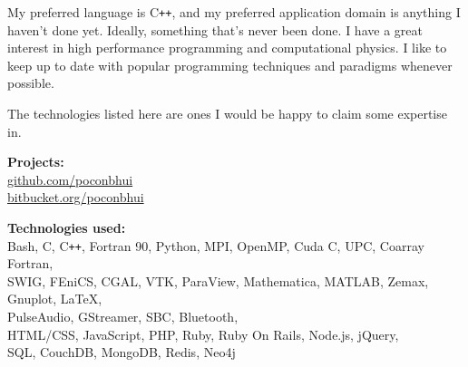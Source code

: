 \documentclass[11pt]{article}
\newcommand{\resumeSection}[1]{
    \par
    \vspace{\baselineskip}
    \large {\sc {#1}}
    \par
    \vspace{-0.9\baselineskip}
    \hrulefill
    \vspace{0.5\baselineskip}
    \par
}
\newenvironment{resumeSubSectionBody}{
    \par
    \vspace{-0.8\parskip}
    \begin{small}
    \par
} {
    \par
    \end{small}
    \par
}
\begin{document}
%
%
\begin{resumeSubSectionBody}

    My preferred language is C\verb!++!,
    and my preferred application domain is anything I haven't done yet.
    Ideally, something that's never been done.
    I have a great interest in high performance programming
    and computational physics.
    I like to keep up to date with popular programming techniques and paradigms
    whenever possible.

    The technologies listed here are ones I would be happy to claim some
    expertise in.

    \begin{description}
        \item{\bf Projects:} \\
            \href{https://github.com/poconbhui}{github.com/poconbhui} \\
            \href{https://bitbucket.org/poconbhui}{bitbucket.org/poconbhui}

        \item{\bf Technologies used:} \\
            Bash, C, C\verb!++!, Fortran 90, Python,
            MPI, OpenMP, Cuda C, UPC, Coarray Fortran,
            \\
            SWIG, FEniCS, CGAL, VTK, ParaView,
            Mathematica, MATLAB, Zemax, Gnuplot, LaTeX,
            \\
            PulseAudio, GStreamer, SBC, Bluetooth,
            \\
            HTML/CSS, JavaScript, PHP, Ruby,
            Ruby On Rails, Node.js, jQuery,
            \\
            SQL, CouchDB, MongoDB, Redis, Neo4j
    \end{description}

\end{resumeSubSectionBody}




\resumeSection{Education \& Training}
\end{document}
